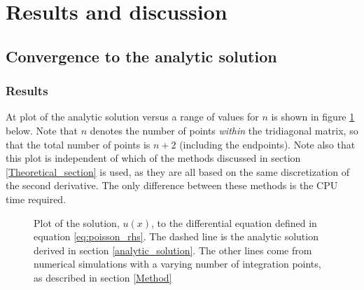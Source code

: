 \documentclass[a4paper, 10pt]{article}
\begin{document}
\section{Results and discussion}
\subsection{Convergence to the analytic solution}\label{Convergence_to_solution}
\subsubsection{Results}
At plot of the analytic solution versus a range of values for $n$ is shown in figure \ref{fig:figure_1} below. Note that $n$ denotes the number of points \textit{within} the tridiagonal matrix, so that the total number of points is $n+2$ (including the endpoints). Note also that this plot is independent of which of the methods discussed in section \ref{Theoretical_section} is used, as they are all based on the same discretization of the second derivative. The only difference between these methods is the CPU time required.\\
\begin{figure}[h!!]
\caption{Plot of the solution, $u(x)$,  to the differential equation defined in equation
\ref{eq:poisson_rhs}. The dashed line is the analytic solution derived in section \ref{analytic_solution}. The other lines come from numerical simulations with a varying number of integration points, as described in section \ref{Method}}
\label{fig:figure_1}
\end{figure}
\newpage
\end{document}
